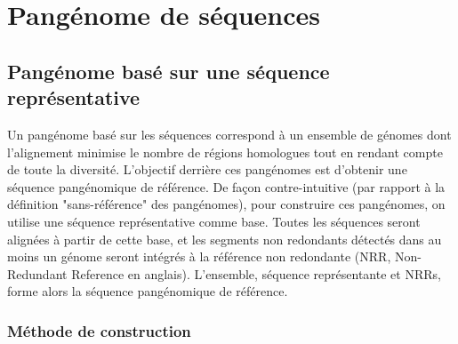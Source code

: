 \newpage
\section{Pangénome de séquences}

\subsection{Pangénome basé sur une séquence représentative}

Un pangénome basé sur les séquences correspond à un ensemble de génomes dont l'alignement minimise le nombre de régions homologues tout en rendant compte de toute la diversité. L'objectif derrière ces pangénomes est d'obtenir une séquence pangénomique de référence. De façon contre-intuitive (par rapport à la définition "sans-référence" des pangénomes), pour construire ces pangénomes, on utilise une séquence représentative comme base. Toutes les séquences seront alignées à partir de cette base, et les segments non redondants détectés dans au moins un génome seront intégrés à la référence non redondante (NRR, Non-Redundant Reference en anglais). L'ensemble, séquence représentante et NRRs, forme alors la séquence pangénomique de référence.

\subsubsection{Méthode de construction}

